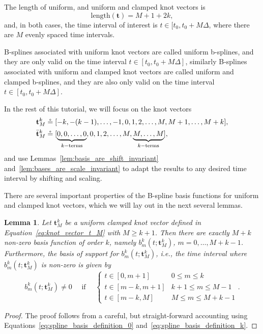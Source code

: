 \documentclass{article}
\newtheorem{lemma}[theorem]{Lemma}
\newcommand{\defeq}{\circeq}
\begin{document}
The length of uniform, and uniform and clamped knot vectors is 
\[
\text{length}(\mathbf{t}) = M+1 + 2k,
\]
and, in both cases, the time interval of interest is $t\in[t_0, t_0+M\Delta$, where there are $M$ evenly spaced time intervals. 

B-splines associated with uniform knot vectors are called uniform b-splines, and they are only valid on the time interval $t\in[t_0, t_0+M\Delta]$, similarly B-splines associated with uniform and clamped knot vectors are called uniform and clamped b-splines, and they are also only valid on the time interval $t\in[t_0, t_0+M\Delta]$.

In the rest of this tutorial, we will focus on the knot vectors
\begin{align}
	\mathbf{t}^k_M &\defeq [-k, -(k-1), \dots, -1, 0, 1, 2, \dots, M, M+1, \dots, M+k],
		\notag \\ 
	\bar{\mathbf{t}}^k_M &\defeq [\underbrace{0, 0, \dots, 0}_{k-\text{terms}}, 0, 1, 2, \dots, M, \underbrace{M, \dots, M}_{k-\text{terms}}], 
	\label{eq:knot_vector_t_M}
\end{align}
and use Lemmas~\ref{lem:basis_are_shift_invariant} and~\ref{lem:bases_are_scale_invariant} to adapt the results to any desired time interval by shifting and scaling.

There are several important properties of the B-spline basis functions for uniform and clamped knot vectors, which we will lay out in the next several lemmas.

\begin{lemma} \label{lem:nonzero_basis_vectors}
	Let $\mathbf{t}_M^k$ be a uniform clamped knot vector defined in Equation~\eqref{eq:knot_vector_t_M} with $M\geq k+1$.
	Then there are exactly $M+k$ non-zero basis function of order $k$, namely $b_m^k(t;\mathbf{t}_M^k)$, $m=0, \dots, M+k-1$.
	Furthermore, the basis of support for $b_m^k(t;\mathbf{t}_M^k)$, i.e., the time interval where $b_m^k(t;\mathbf{t}_M^k)$ is non-zero is given by
		\[
				b_m^k(t;\mathbf{t}_M^k) \neq 0 
				\quad \text{~if~} \quad
				\begin{cases}
				t \in [0, m+1] & 0\leq m \leq k \\
				t \in [m-k, m+1] & k+1 \leq m \leq M-1 \\
				t \in [m-k, M] & M \leq m \leq M+k-1
				\end{cases}.
		\]	
\end{lemma}
\begin{proof}  The proof follows from a careful, but straight-forward accounting using Equations~\eqref{eq:spline_basis_definition_0} and~\eqref{eq:spline_basis_definition_k}.	
\end{proof}
\end{document}

